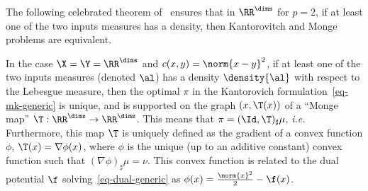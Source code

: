 The following celebrated theorem of~\cite{Brenier91} ensures that in $\RR^\dims$ for $p=2$, if at least one of the two inputs measures has a density, then Kantorovitch and Monge problems are equivalent.

\begin{thm}[Brenier]
	In the case $\X=\Y=\RR^\dims$ and $c(x,y)=\norm{x-y}^2$, if at least one of the two inputs measures (denoted $\al$) has a density $\density{\al}$ with respect to the Lebesgue measure, then the optimal $\pi$ in the Kantorovich formulation~\eqref{eq-mk-generic} is unique, and is supported on the graph $(x,\T(x))$ of a ``Monge map'' $\T : \RR^\dims \rightarrow \RR^\dims$. This means that $\pi = (\Id,\T)_{\sharp} \mu$, \emph{i.e.} 
Furthermore, this map $\T$ is uniquely defined as the gradient of a convex function $\phi$, $\T(x) = \nabla\phi(x)$, where $\phi$ is the unique (up to an additive constant) convex function such that $(\nabla\phi)_\sharp \mu=\nu$. This convex function is related to the dual potential $\f$ solving~\eqref{eq-dual-generic} as $\phi(x)=\frac{\norm{x}^2}{2}-\f(x)$.
\end{thm}

